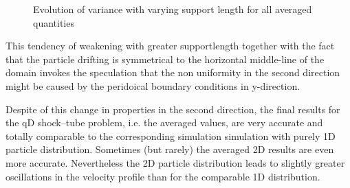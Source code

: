 \documentclass{report}
\begin{document}
\begin{figure}[!htbp]
\centering
\label{fig:2DSPHresults_CS_varianceVersusSuplen}

\caption[]{Evolution of variance with varying support length for all averaged quantities}

\end{figure}

This tendency of weakening with greater supportlength together with the fact that the particle drifting is symmetrical to the horizontal middle-line of the domain invokes the speculation that the non uniformity in the second direction might be caused by the peridoical boundary conditions in y-direction.


 
Despite of this change in properties in the second direction, the final results for the qD shock--tube problem, i.e. the averaged values, are very accurate and totally comparable to the corresponding simulation simulation with purely 1D particle distribution. Sometimes (but rarely) the averaged 2D results are even more accurate.
Nevertheless the 2D particle distribution leads to slightly greater oscillations in the velocity profile than for the comparable 1D distribution.
 
\end{document}
